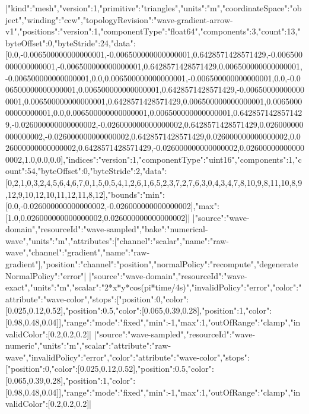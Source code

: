 \documentclass{article}
\begin{document}
\TLSetup{\usepackage{cmbright}}

|{"kind":"mesh","version":1,"primitive":"triangles","units":"m","coordinateSpace":"object","winding":"ccw","topologyRevision":"wave-gradient-arrow-v1","positions":{"version":1,"componentType":"float64","components":3,"count":13,"byteOffset":0,"byteStride":24,"data":[0.0,-0.006500000000000001,-0.006500000000000001,0.6428571428571429,-0.006500000000000001,-0.006500000000000001,0.6428571428571429,0.006500000000000001,-0.006500000000000001,0.0,0.006500000000000001,-0.006500000000000001,0.0,-0.006500000000000001,0.006500000000000001,0.6428571428571429,-0.006500000000000001,0.006500000000000001,0.6428571428571429,0.006500000000000001,0.006500000000000001,0.0,0.006500000000000001,0.006500000000000001,0.6428571428571429,-0.026000000000000002,-0.026000000000000002,0.6428571428571429,0.026000000000000002,-0.026000000000000002,0.6428571428571429,0.026000000000000002,0.026000000000000002,0.6428571428571429,-0.026000000000000002,0.026000000000000002,1.0,0.0,0.0]},"indices":{"version":1,"componentType":"uint16","components":1,"count":54,"byteOffset":0,"byteStride":2,"data":[0,2,1,0,3,2,4,5,6,4,6,7,0,1,5,0,5,4,1,2,6,1,6,5,2,3,7,2,7,6,3,0,4,3,4,7,8,10,9,8,11,10,8,9,12,9,10,12,10,11,12,11,8,12]},"bounds":{"min":[0.0,-0.026000000000000002,-0.026000000000000002],"max":[1.0,0.026000000000000002,0.026000000000000002]}}|
|{"source":"wave-domain","resourceId":"wave-sampled","bake":"numerical-wave","units":"m","attributes":[{"channel":"scalar","name":"raw-wave"},{"channel":"gradient","name":"raw-gradient"}],"position":{"channel":"position","normalPolicy":"recompute","degenerateNormalPolicy":"error"}}|
|{"source":"wave-domain","resourceId":"wave-exact","units":"m","scalar":"2*x*y*cos(pi*time/4s)","invalidPolicy":"error","color":{"attribute":"wave-color","stops":[{"position":0,"color":[0.025,0.12,0.52]},{"position":0.5,"color":[0.065,0.39,0.28]},{"position":1,"color":[0.98,0.48,0.04]}],"range":{"mode":"fixed","min":-1,"max":1},"outOfRange":"clamp","invalidColor":[0.2,0.2,0.2]}}|
|{"source":"wave-sampled","resourceId":"wave-numeric","units":"m","scalar":{"attribute":"raw-wave"},"invalidPolicy":"error","color":{"attribute":"wave-color","stops":[{"position":0,"color":[0.025,0.12,0.52]},{"position":0.5,"color":[0.065,0.39,0.28]},{"position":1,"color":[0.98,0.48,0.04]}],"range":{"mode":"fixed","min":-1,"max":1},"outOfRange":"clamp","invalidColor":[0.2,0.2,0.2]}}|
\end{document}
